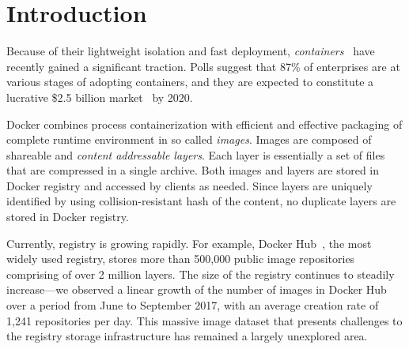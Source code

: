 \section{Introduction}

Because of their lightweight isolation and fast deployment,
\emph{containers}~\cite{process-containers-linux} have recently gained a
significant traction.
%
Polls suggest that 87\% of enterprises are at various stages of adopting
containers, and they are expected to constitute a lucrative \$2.5 billion
market~\cite{container-grow-by2020} by 2020.

Docker combines process containerization with efficient and effective packaging
of complete runtime environment in so called {\em images}.
%
Images are composed of shareable and {\em content addressable layers}.
%
Each layer is essentially a set of files that 
are compressed in a single archive.
%
Both images and layers are stored in Docker registry and accessed by clients as
needed.
%
Since layers are uniquely identified by using collision-resistant hash of the
content, no duplicate layers are stored in Docker registry.

Currently, registry is growing rapidly.
%
For example,   Docker Hub~\cite{docker-hub}, the most widely used registry,
stores more than 500,000 public image repositories comprising of over 2 million
layers.
%
The size of the registry continues to steadily increase---we observed a
linear growth of the number of images in Docker Hub over a period from June to
September 2017, with an average creation rate of 1,241 repositories per day.
%
%
This massive image dataset that presents challenges to the registry storage
infrastructure has remained a largely unexplored area.

